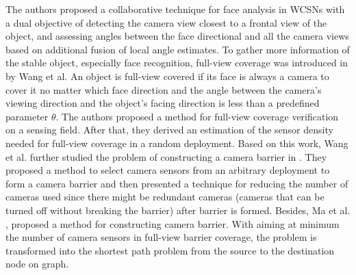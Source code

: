 The authors \cite{chang2006collaborative} proposed a collaborative technique for face analysis in WCSNs with a dual objective of detecting the camera view closest to a frontal view of the object, and assessing angles between the face directional and all the camera views based on additional fusion of local angle estimates. To gather more information of the stable object, especially face recognition, full-view coverage was introduced in \cite{wang2013achieving} by Wang et al. An object is full-view covered if its face is always a camera to cover it no matter which face direction and the angle between the camera’s viewing direction and the object’s facing direction is less than a predefined parameter $\theta$. The authors proposed a method for full-view coverage verification on a sensing field. After that, they derived an estimation of the sensor density needed for full-view coverage in a random deployment. Based on this work, Wang et al. further studied the problem of constructing a camera barrier in \cite{wang2011barrier}. They proposed a method to select camera sensors from an arbitrary deployment to form a camera barrier and then presented a technique for reducing the number of cameras used since there might be redundant cameras (cameras that can be turned off without breaking the barrier) after barrier is formed. Besides, Ma et al. \cite{ma2012minimum}, proposed a method for constructing camera barrier. With aiming at minimum the number of camera sensors in full-view barrier coverage, the problem is transformed into the shortest path problem from the source to the destination node on graph.

